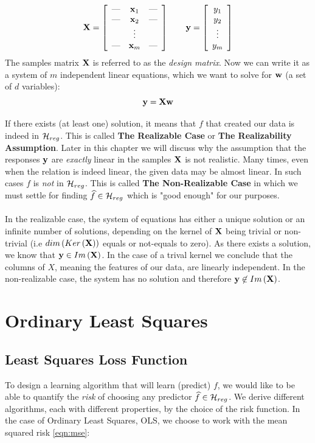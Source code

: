 $$
\mathbf{X} =
\left[
\begin{array}{ccc}
\hbox{---} & \mathbf{x}_1 & \hbox{---} \\
\hbox{---} & \mathbf{x}_2 & \hbox{---} \\
		 & \vdots    & \\
\hbox{---} & \mathbf{x}_m & \hbox{---}
\end{array}
\right]\quad\quad
\mathbf{y}=\left[\begin{array}{c} y_1 \\ y_2 \\ \vdots \\ y_m \end{array}\right]
$$
The samples matrix $\mathbf{X}$ is referred to as the \textit{design matrix}. Now we can write it as a system of $m$ independent linear equations, which we want to solve for $\mathbf{w}$ (a set of $d$ variables): 
\begin{equation}
\mathbf{y}=\mathbf{X}\mathbf{w}
\label{eqn:lin_reg_model}
\end{equation}

If there exists (at least one) solution, it means that $f$ that created our data is indeed in $\mathcal{H}_{reg}$. This is called \textbf{The Realizable Case} or \textbf{The Realizability Assumption}. Later in this chapter we will discuss why the assumption that the responses $\mathbf{y}$ are \textit{exactly} linear in the samples $\mathbf{X}$ is not realistic. Many times, even when the relation is indeed linear, the given data may be almost linear. In such cases $f$ is \textit{not} in $\mathcal{H}_{reg}$. This is called \textbf{The Non-Realizable Case} in which we must settle for finding $\widehat{f}\in\mathcal{H}_{reg}$ which is "good enough" for our purposes.
\\~\\
In the realizable case, the system of equations has either a unique solution or an infinite number of solutions, depending on the kernel of $\mathbf{X}$ being trivial or non-trivial (i.e $dim\left(Ker\left(\mathbf{X}\right)\right)$ equals or not-equals to zero). As there exists a solution, we know that $\mathbf{y}\in Im\left(\mathbf{X}\right)$. In the case of a trival kernel we conclude that the columns of $X$, meaning the features of our data, are linearly independent. In the non-realizable case, the system has no solution and therefore $\mathbf{y}\not\in Im\left(\mathbf{X}\right)$.



\section{Ordinary Least Squares}
\subsection{Least Squares Loss Function} %
To design a learning algorithm that will learn (predict) $f$, we would like to be able to quantify the \textit{risk} of choosing any predictor $\widehat{f}\in\mathcal{H}_{reg}$. We derive different algorithms, each with different properties, by the choice of the risk function. In the case of Ordinary Least Squares, OLS, we choose to work with the mean squared risk \eqref{eqn:mse}: 

